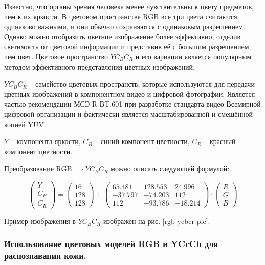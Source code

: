 Известно, что органы зрения человека менее чувствительны к цвету предметов, чем к их яркости. В
цветовом пространстве RGB все три цвета считаются одинаково важными, и они обычно сохраняются
с одинаковым разрешением. Однако можно отобразить цветное изображение более эффективно, 
отделив светимость от цветовой информации и представив её с большим разрешением, чем цвет.
Цветовое пространство $YC_BC_R$ и его вариации является популярным методом эффективного
представления цветных изображений.

$YC_BC_R$ -- семейство цветовых пространств, которые используются для передачи цветных
изображений в компонентном видео и цифровой фотографии. Является частью рекомендации 
МСЭ-R ВT.601 при разработке стандарта видео Всемирной цифровой организации и фактически
является масштабированной и смещённой копией YUV. 

$Y$ -- компонента яркости, $C_B$ -- синий компонент цветности, $C_R$ -- красный компонент
цветности.

Преобразование RGB $\Rightarrow YC_BC_R$ можно описать следующей
формулой:

\begin{equation}
\begin{pmatrix} Y \\ C_B \\ C_R \end{pmatrix}
=
\begin{pmatrix} 16 \\ 128 \\ 128 \end{pmatrix} + 
\begin{pmatrix}
	65.481 & 128.553 & 24.996\\
	-37.797 & -74.203 & 112\\
	112 & -93.786 & -18.214
\end{pmatrix}
\cdot
\begin{pmatrix} R \\ G \\ B\end{pmatrix}
\label{rgb-to-ycbcr}
\end{equation}

Пример изображения в $YC_BC_R$ изображен на рис. 
\ref{rgb-ycbcr-pic}.


\subsubsection{Использование цветовых моделей RGB и YCrCb для распознавания кожи.}

